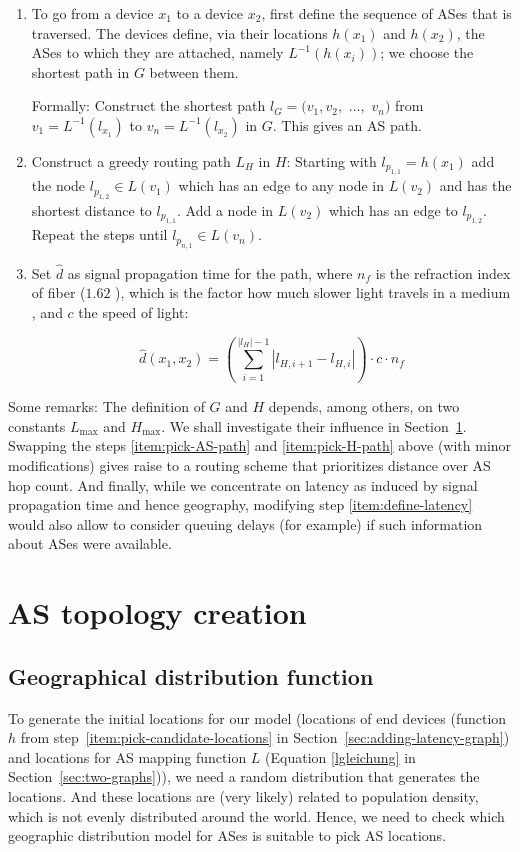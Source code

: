 \documentclass{sig-alternate-10pt}
\begin{document}
\begin{enumerate}
\begin{enumerate}
\item  \label{item:pick-AS-path} To go from a device $x_1$ to a device $x_2$, first define the sequence of ASes that is traversed. The devices define, via their locations $h(x_1)$ and $h(x_2)$,  the ASes to which they are attached, namely $L^{-1}(h(x_i))$; we choose the shortest path in $G$ between them. 

Formally: Construct the shortest path $l_G=(v_1,v_2,$ $\ldots,$ $v_n)$ from $v_1 = L^{-1}(l_{x_1})$ to $v_n=L^{-1}(l_{x_2})$ in $G$. This gives an AS path.
\item \label{item:pick-H-path} Construct a greedy routing path $L_H$ in $H$: Starting with $l_{p_{1,1}}=h({x_1})$ add the node $l_{p_{1,2}} \in L(v_1)$ which has an edge to any node in $L(v_2)$ and has the shortest distance to $l_{p_{1,1}}$. Add a node in $L(v_{2})$ which has an edge to $l_{p_{1,2}}$. Repeat the steps until $l_{p_{n,1}} \in L(v_n)$.
\item \label{item:define-latency} Set $\hat d$ as signal propagation time for the path, where $n_f$ is the refraction index of fiber ($1.62$ \cite{Ramaswami2009}), which is the factor how much slower light travels in a medium , and $c$ the speed of light:

\[ \hat d(x_1,x_2)=\left(\sum_{i=1}^{|l_H|-1} |l_{H,i+1} - l_{H,i}| \right) \cdot c \cdot n_{f}\]
\end{enumerate}

\noindent Some remarks: The definition of $G$ and $H$ depends, among others, on two constants $L_\mathrm{max}$ and $H_\mathrm{max}$. We shall investigate their influence in Section~\ref{sec:as-topology-creation}. Swapping the steps \ref{item:pick-AS-path} and \ref{item:pick-H-path} above (with minor modifications) gives raise to a routing scheme that prioritizes distance over AS hop count. And finally, while we concentrate on latency as induced by signal propagation time and hence geography, modifying step \ref{item:define-latency} would also allow to consider queuing delays (for example) if such information about ASes were available. 



\section{AS topology creation}
\label{sec:as-topology-creation}
\subsection{Geographical distribution function}
To generate the initial locations for our model (locations of end devices (function $h$ from
step~\ref{item:pick-candidate-locations} in Section~\ref{sec:adding-latency-graph}) and locations for AS mapping function $L$ (Equation \ref{lgleichung} in Section~\ref{sec:two-graphs})), we need a random distribution that generates the locations. 
And these locations are (very likely) related to population density, which is  not evenly distributed around the world. Hence, we need to check which geographic distribution model for ASes is suitable to pick AS locations.  


\end{enumerate}
\end{document}
